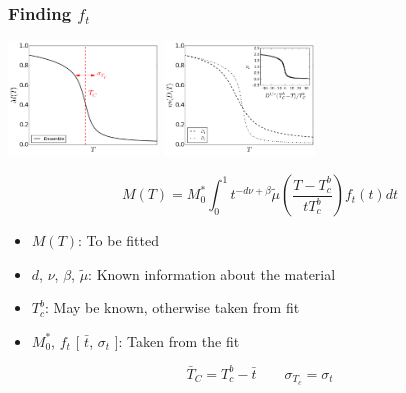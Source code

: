 \documentclass{beamer}
\begin{document}
\begin{frame}
	\frametitle{Finding $f_t$}

	\begin{center}
	\includegraphics[width=4cm]{Images/Aggregate} \hspace{3mm}
	\includegraphics[width=4cm]{Images/Ds}

	$$
	M(T) = M_0^*\int_0^1 t^{-d\nu +\beta} \tilde{\mu}\left(\frac{T-T_c^b}{tT_c^b}\right) f_t(t) dt
	$$

	\begin{itemize}
		\item{$M(T)$: To be fitted}
		\item{$d$, $\nu$, $\beta$, $\tilde{\mu}$: Known information about the material}
		\item{$T_c^b$: May be known, otherwise taken from fit}
		\item{$M_0^*$, $f_t$ [ $\bar{t}$, $\sigma_t$ ]: Taken from the fit}
	\end{itemize}

	$$
	\bar{T}_C = T_c^b - \bar{t} \quad \quad \sigma_{T_c} = \sigma_t
	$$

	\end{center}
\end{frame}
\end{document}
